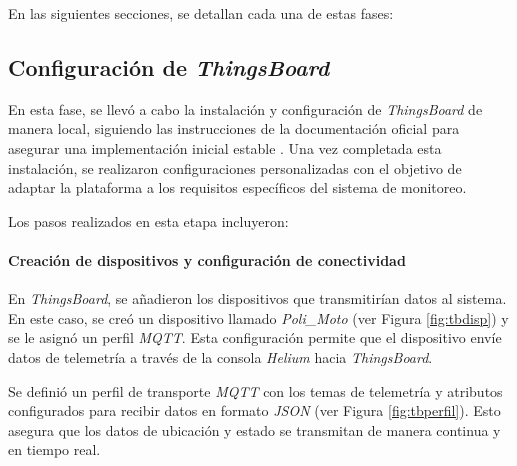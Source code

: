 En las siguientes secciones, se detallan cada una de estas fases:



\subsection{Configuración de \textit{ThingsBoard}}

En esta fase, se llevó a cabo la instalación y configuración de \textit{ThingsBoard} de manera local, siguiendo las instrucciones de la documentación oficial para asegurar una implementación inicial estable \cite{ThingsBoard_docs}. Una vez completada esta instalación, se realizaron configuraciones personalizadas con el objetivo de adaptar la plataforma a los requisitos específicos del sistema de monitoreo.

Los pasos realizados en esta etapa incluyeron:

\paragraph{Creación de dispositivos y configuración de conectividad\\}

En \textit{ThingsBoard}, se añadieron los dispositivos que transmitirían datos al sistema. En este caso, se creó un dispositivo llamado \textit{Poli\_Moto} (ver Figura \ref{fig:tbdisp}) y se le asignó un perfil \textit{MQTT}. Esta configuración permite que el dispositivo envíe datos de telemetría a través de la consola \textit{Helium} hacia \textit{ThingsBoard}.

Se definió un perfil de transporte \textit{MQTT} con los temas de telemetría y atributos configurados para recibir datos en formato \textit{JSON} (ver Figura \ref{fig:tbperfil}). Esto asegura que los datos de ubicación y estado se transmitan de manera continua y en tiempo real.


